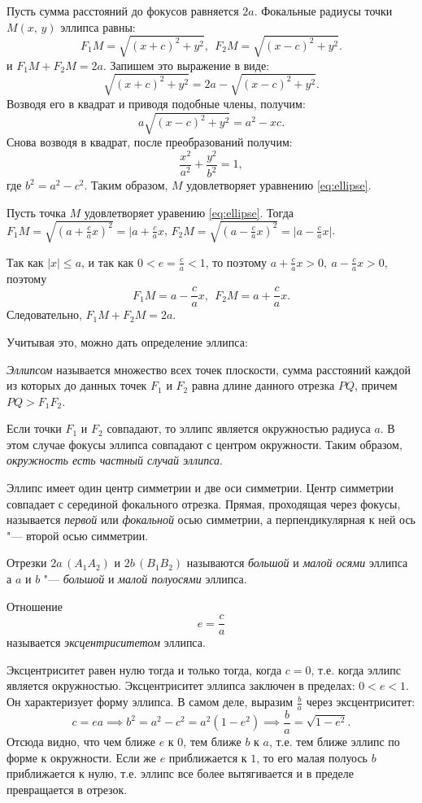 \begin{Proof}
  Пусть сумма расстояний до фокусов равняется $2a$. Фокальные радиусы точки $M(x,\, y)$ эллипса равны:
  $$
    F_1M = \sqrt{(x + c)^2 + y^2}, ~~ F_2M = \sqrt{(x - c)^2 + y^2}.
  $$
  и $F_1M + F_2M = 2a$. Запишем это выражение в виде:
  $$
    \sqrt{(x + c)^2 + y^2} = 2a - \sqrt{(x - c)^2 + y^2}.
  $$
  Возводя его в квадрат и приводя подобные члены, получим:
  $$
    a\sqrt{(x - c)^2 + y^2} = a^2 - xc.
  $$
  Снова возводя в квадрат, после преобразований получим:
  $$
    \frac{x^2}{a^2} + \frac{y^2}{b^2} = 1,
  $$
  где $b^2  = a^2 - c^2$. Таким образом, $M$ удовлетворяет уравнению \ref{eq:ellipse}.

  Пусть точка $M$ удовлетворяет уравению \ref{eq:ellipse}. Тогда $F_1M = \sqrt{(a + \frac{c}{a}x)^2} = \mathopen|a + \frac{c}{a}x$, $F_2M = \sqrt{(a - \frac{c}{a}x)^2} = \mathopen|a - \frac{c}{a}x\mathclose|$. 

  Так как $\mathopen|x\mathclose| \leq a$, и так как $0 < e = \frac{c}{a} < 1$, то поэтому $a + \frac{c}{a}x > 0, ~ a - \frac{c}{a}x > 0$, поэтому $$
    F_1M = a - \frac{c}{a}x, ~~ F_2M = a + \frac{c}{a}x.
  $$
  Следовательно, $F_1M + F_2M = 2a$.
\end{Proof}

Учитывая это, можно дать определение эллипса:
\begin{definition}
  \textit{Эллипсом} называется множество всех точек плоскости, сумма расстояний каждой из которых до данных точек $F_1$ и $F_2$ равна длине данного отрезка $PQ$, причем $PQ > F_1F_2$.
\end{definition}

Если точки $F_1$ и $F_2$ совпадают, то эллипс является окружностью радиуса $a$. В этом случае фокусы эллипса совпадают с центром окружности. Таким образом, \textit{окружность есть частный случай эллипса}.

Эллипс имеет один центр симметрии и две оси симметрии. Центр симметрии совпадает с серединой фокального отрезка. Прямая, проходящая через фокусы, называется \textit{первой} или \textit{фокальной} осью симметрии, а перпендикулярная к ней ось "--- второй осью симметрии.

Отрезки $2a \, (A_1A_2)$ и $2b \, (B_1B_2)$ называются \textit{большой} и \textit{малой осями} эллипса а $a$ и $b$ "--- \textit{большой} и \textit{малой полуосями} эллипса.

Отношение
$$
  e = \frac{c}{a}
$$ называется \textit{эксцентриситетом} эллипса.

Эксцентриситет равен нулю тогда и только тогда, когда $c = 0$, т.е. когда
эллипс является окружностью. Эксцентриситет эллипса заключен в пределах: $0 < e < 1$. Он характеризует форму эллипса. В самом деле, выразим $\frac{b}{a}$ через эксцентриситет:
$$
  c = ea \implies b^2 = a^2 - c^2 = a^2(1 - e^2) \implies \frac{b}{a} = \sqrt{1 - e^2}.
$$
Отсюда видно, что чем ближе $e$ к $0$, тем ближе $b$ к $a$, т.е. тем ближе эллипс
по форме к окружности. Если же $e$ приближается к $1$, то его малая полуось $b$ приближается к нулю, т.е. эллипс все более вытягивается и в пределе превращается в отрезок.


